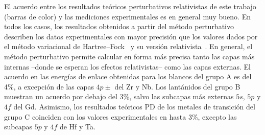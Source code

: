 El acuerdo entre los resultados teóricos perturbativos relativistas de 
este trabajo (barras de color) y las mediciones experimentales es en 
general muy bueno. En todos los casos, los resultados obtenidos a partir 
del método perturbativo describen los datos experimentales con mayor 
precisión que los valores dados por el método variacional de 
Hartree--Fock~\cite{FroeseFischer:97} y su versión 
relativista~\cite{Desclaux:73}. En general, el método perturbativo 
permite calcular en forma más precisa tanto las capas más internas 
--donde se esperan los efectos relativistas-- como las capas externas.
El acuerdo en las energías de enlace obtenidas para los blancos del 
grupo A es del 
4\%, a excepción de las capas $4p\pm$ del Zr y Nb. Los lantánidos del 
grupo B muestran un acuerdo por debajo del 3\%, salvo las subcapas más 
externas $5s$, $5p$ y $4f$ del Gd. Asimismo, los resultados teóricos PD 
de los metales de transición del grupo C coinciden con los valores 
experimentales en hasta 3\%, excepto las subcapas $5p$ y $4f$ de Hf y 
Ta. 



